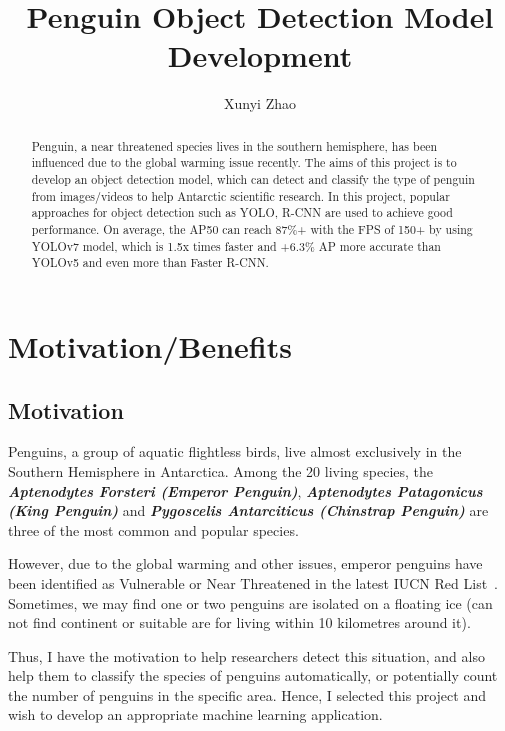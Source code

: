\documentclass[runningheads]{llncs}
\begin{document}
%
\title{Penguin Object Detection Model Development}

\author{Xunyi Zhao}
%
\maketitle
%
\begin{abstract}
Penguin, a near threatened species lives in the southern hemisphere, has been influenced due to the global warming issue recently. The aims of this project is to develop an object detection model, which can  detect and classify the type of penguin from images/videos to help Antarctic scientific research. In this project, popular approaches for object detection such as YOLO, R-CNN are used to achieve good performance. On average, the AP50 can reach 87\%+ with the FPS of 150+ by using YOLOv7 model, which is 1.5x times faster and +6.3\% AP more accurate than YOLOv5 and even more than Faster R-CNN.

\end{abstract}
%
%

\section{Motivation/Benefits}
\subsection{Motivation}
Penguins, a group of aquatic flightless birds, live almost exclusively in the Southern Hemisphere in Antarctica. Among the 20 living species, the \textbf{\textit{Aptenodytes Forsteri (Emperor Penguin)}}, \textbf{\textit{Aptenodytes Patagonicus (King Penguin)}} and \textbf{\textit{Pygoscelis Antarciticus (Chinstrap Penguin)}} are three of the most common and popular species. 

However, due to the global warming and other issues, emperor penguins have been identified as Vulnerable or Near Threatened in the latest IUCN Red List~\cite{ref_red_list}. Sometimes, we may find one or two penguins are isolated on a floating ice (can not find continent or suitable are for living within 10 kilometres around it).

Thus, I have the motivation to help researchers detect this situation, and also help them to classify the species of penguins automatically, or potentially count the number of penguins in the specific area. Hence, I selected this project and wish to develop an appropriate machine learning application.
\end{document}
